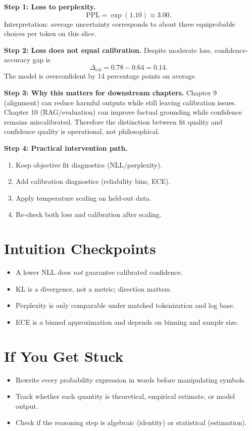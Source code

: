 \textbf{Step 1: Loss to perplexity.}
\[
\mathrm{PPL}=\exp(1.10)\approx 3.00.
\]
Interpretation: average uncertainty corresponds to about three equiprobable choices per token on this slice.

\textbf{Step 2: Loss does not equal calibration.}  
Despite moderate loss, confidence-accuracy gap is
\[
\Delta_{\mathrm{cal}} = 0.78 - 0.64 = 0.14.
\]
The model is overconfident by 14 percentage points on average.

\textbf{Step 3: Why this matters for downstream chapters.}  
Chapter 9 (alignment) can reduce harmful outputs while still leaving calibration issues.  
Chapter 10 (RAG/evaluation) can improve factual grounding while confidence remains miscalibrated.  
Therefore the distinction between fit quality and confidence quality is operational, not philosophical.

\textbf{Step 4: Practical intervention path.}
\begin{enumerate}[leftmargin=1.5em]
  \item Keep objective fit diagnostics (NLL/perplexity).
  \item Add calibration diagnostics (reliability bins, ECE).
  \item Apply temperature scaling on held-out data.
  \item Re-check both loss and calibration after scaling.
\end{enumerate}

\section*{Intuition Checkpoints}
\begin{itemize}[leftmargin=1.5em]
  \item A lower NLL does \emph{not} guarantee calibrated confidence.
  \item KL is a divergence, not a metric; direction matters.
  \item Perplexity is only comparable under matched tokenization and log base.
  \item ECE is a binned approximation and depends on binning and sample size.
\end{itemize}

\section*{If You Get Stuck}
\begin{itemize}[leftmargin=1.5em]
  \item Rewrite every probability expression in words before manipulating symbols.
  \item Track whether each quantity is theoretical, empirical estimate, or model output.
  \item Check if the reasoning step is algebraic (identity) or statistical (estimation).
\end{itemize}

